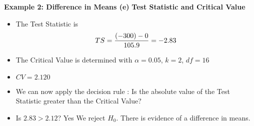\documentclass[a4]{beamer}
\begin{document}

\noindent \textbf{Example 2: Difference in Means (e) }
\textbf{Test Statistic and Critical Value}\\
\begin{itemize}
\item The Test Statistic is \[ TS  = {(-300) - 0 \over 105.9}  = -2.83 \]
\item The Critical Value is determined with $\alpha = 0.05$, $k=2$, $df = 16 $
\item $CV = 2.120$
\item We can now apply the decision rule : Is the absolute value of the Test Statistic greater than the Critical Value?
\item Is $2.83 > 2.12$? Yes We reject $H_0$. There is evidence of a difference in means.
\end{itemize}
\end{document}
